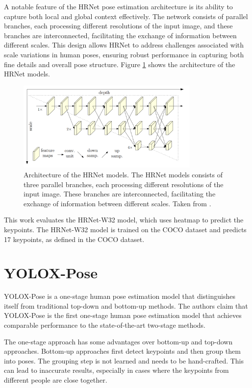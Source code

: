 A notable feature of the HRNet pose estimation architecture is its ability to capture both local and global context effectively. The network consists of parallel branches, each processing different resolutions of the input image, and these branches are interconnected, facilitating the exchange of information between different scales. This design allows HRNet to address challenges associated with scale variations in human poses, ensuring robust performance in capturing both fine details and overall pose structure. Figure \ref{fig:hrnet_architecture} shows the architecture of the HRNet models.

\begin{figure}[htbp]
    \centering
    \includegraphics[width=0.8\textwidth]{obrazky-figures/hrnet_architecture.png}
    \caption{Architecture of the HRNet models. The HRNet models consists of three parallel branches, each processing different resolutions of the input image. These branches are interconnected, facilitating the exchange of information between different scales. Taken from \cite{hrnet}.}
    \label{fig:hrnet_architecture}
\end{figure}

This work evaluates the HRNet-W32 model, which uses heatmap to predict the keypoints. The HRNet-W32 model is trained on the COCO dataset and predicts 17 keypoints, as defined in the COCO dataset.


\section{YOLOX-Pose}
\label{yolox-pose}

YOLOX-Pose  is a one-stage human pose estimation model that distinguishes itself from traditional top-down and bottom-up methods. The authors claim that YOLOX-Pose is the first one-stage human pose estimation model that achieves comparable performance to the state-of-the-art two-stage methods.

The one-stage approach has some advantages over bottom-up and top-down approaches. Bottom-up approaches first detect keypoints and then group them into poses. The grouping step is not learned and needs to be hand-crafted. This can lead to inaccurate results, especially in cases where the keypoints from different people are close together.

